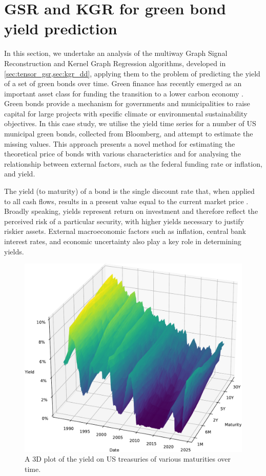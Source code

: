  
\newpage 

\section{GSR and KGR for green bond yield prediction}

\label{sec:green_bonds}

In this section, we undertake an analysis of the multiway Graph Signal Reconstruction and Kernel Graph Regression algorithms, developed in \cref{sec:tensor_gsr,sec:kgr_dd}, applying them to the problem of predicting the yield of a set of green bonds over time. Green finance has recently emerged as an important asset class for funding the transition to a lower carbon economy \citep{Peters2022}. Green bonds provide a mechanism for governments and municipalities to raise capital for large projects with specific climate or environmental sustainability objectives. In this case study, we utilise the yield time series for a number of US municipal green bonds, collected from Bloomberg, and attempt to estimate the missing values. This approach presents a novel method for estimating the theoretical price of bonds with various characteristics and for analysing the relationship between external factors, such as the federal funding rate or inflation, and yield. 

The yield (to maturity) of a bond is the single discount rate that, when applied to all cash flows, results in a present value equal to the current market price \citep{Hull2009}. Broadly speaking, yields represent return on investment and therefore reflect the perceived risk of a particular security, with higher yields necessary to justify riskier assets. External macroeconomic factors such as inflation, central bank interest rates, and economic uncertainty also play a key role in determining yields. 

\begin{figure}[b] 
    \begin{center}
        \includegraphics[width=0.75\linewidth]{Figures/fed_rates.pdf}
    \end{center}
   \caption[3D plot of the yield on US treasuries of various maturities over time]{A 3D plot of the yield on US treasuries of various maturities over time. } 
    \label{fig:US_yield_curve} 
\end{figure} 

